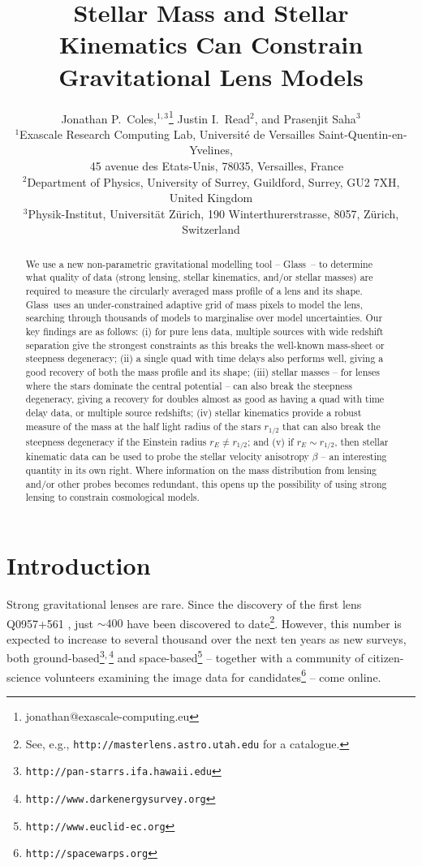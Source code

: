 \documentclass[galley,usenatbib]{mn2e}
\title[Lens Recovery with \Glass]{Stellar Mass and Stellar Kinematics Can Constrain Gravitational Lens Models}
\author[J.~P.~Coles~et~al.]{%
Jonathan P.~Coles,$^{1,3}$\thanks{jonathan@exascale-computing.eu}%
\newauthor%
Justin I.~Read$^2$,%
\newauthor%
and Prasenjit Saha$^3$%
%
\\
$^1$Exascale Research Computing Lab, Universit\'e de Versailles Saint-Quentin-en-Yvelines,\\$\quad$45 avenue des Etats-Unis, 78035, Versailles, France\\
$^2$Department of Physics, University of Surrey, Guildford, Surrey, GU2 7XH, United Kingdom \\
$^3$Physik-Institut, Universit\"at Z\"urich, 190 Winterthurerstrasse, 8057, Z\"urich, Switzerland
}
\newcommand{\Glass}{{\sc Glass}}
\newcommand{\url}[1]{\tt #1}
\begin{document}
\maketitle

\begin{abstract}
We use a new non-parametric gravitational modelling tool -- \Glass\ -- to
determine what quality of data (strong lensing, stellar kinematics, and/or
stellar masses) are required to measure the circularly averaged mass profile of
a lens and its shape. \Glass\ uses an under-constrained adaptive grid of mass
pixels to model the lens, searching through thousands of models to marginalise
over model uncertainties. Our key findings are as follows: (i) for pure lens
data, multiple sources with wide redshift separation give the strongest
constraints as this breaks the well-known mass-sheet or steepness degeneracy;
(ii) a single quad with time delays also performs well, giving a good recovery
of both the mass profile and its shape; (iii) stellar masses -- for lenses
where the stars dominate the central potential -- can also break the steepness
degeneracy, giving a recovery for doubles almost as good as having a quad with time delay data, or
multiple source redshifts; (iv) stellar kinematics provide a robust measure of
the mass at the half light radius of the stars $r_{1/2}$ that can also break
the steepness degeneracy if the Einstein radius $r_E \neq r_{1/2}$; and (v)
if $r_E \sim r_{1/2}$, then stellar kinematic data can be used to probe the
stellar velocity anisotropy $\beta$ -- an interesting quantity in its own
right. Where information on the mass distribution from lensing and/or other
probes becomes redundant, this opens up the possibility of using strong lensing
to constrain cosmological models. 
\end{abstract}


\section{Introduction}\label{sec:intro}

Strong gravitational lenses are rare. Since the discovery of the first lens
Q0957+561 \citep{1979Natur.279..381W}, just $\sim400$ have been discovered to
date\footnote{See, e.g., {\url{http://masterlens.astro.utah.edu}} for a catalogue.}.
However, this number is expected to increase to several thousand over the next
ten years as new surveys, both
ground-based\footnote{\url{http://pan-starrs.ifa.hawaii.edu}}$^{\rm,}$\footnote{\url{http://www.darkenergysurvey.org}}
and space-based\footnote{\url{http://www.euclid-ec.org}} -- together with a community
of citizen-science volunteers examining the image data for
candidates\footnote{\url{http://spacewarps.org}} -- come online. 
\end{document}
